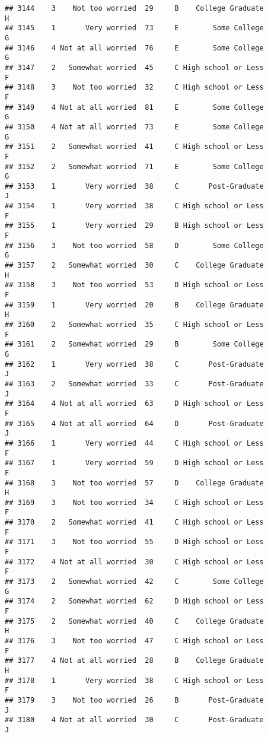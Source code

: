 \documentclass[
]{article}
\begin{document}
\begin{verbatim}
## 3144    3    Not too worried  29     B    College Graduate         H
## 3145    1       Very worried  73     E        Some College         G
## 3146    4 Not at all worried  76     E        Some College         G
## 3147    2   Somewhat worried  45     C High school or Less         F
## 3148    3    Not too worried  32     C High school or Less         F
## 3149    4 Not at all worried  81     E        Some College         G
## 3150    4 Not at all worried  73     E        Some College         G
## 3151    2   Somewhat worried  41     C High school or Less         F
## 3152    2   Somewhat worried  71     E        Some College         G
## 3153    1       Very worried  38     C       Post-Graduate         J
## 3154    1       Very worried  38     C High school or Less         F
## 3155    1       Very worried  29     B High school or Less         F
## 3156    3    Not too worried  58     D        Some College         G
## 3157    2   Somewhat worried  30     C    College Graduate         H
## 3158    3    Not too worried  53     D High school or Less         F
## 3159    1       Very worried  20     B    College Graduate         H
## 3160    2   Somewhat worried  35     C High school or Less         F
## 3161    2   Somewhat worried  29     B        Some College         G
## 3162    1       Very worried  38     C       Post-Graduate         J
## 3163    2   Somewhat worried  33     C       Post-Graduate         J
## 3164    4 Not at all worried  63     D High school or Less         F
## 3165    4 Not at all worried  64     D       Post-Graduate         J
## 3166    1       Very worried  44     C High school or Less         F
## 3167    1       Very worried  59     D High school or Less         F
## 3168    3    Not too worried  57     D    College Graduate         H
## 3169    3    Not too worried  34     C High school or Less         F
## 3170    2   Somewhat worried  41     C High school or Less         F
## 3171    3    Not too worried  55     D High school or Less         F
## 3172    4 Not at all worried  30     C High school or Less         F
## 3173    2   Somewhat worried  42     C        Some College         G
## 3174    2   Somewhat worried  62     D High school or Less         F
## 3175    2   Somewhat worried  40     C    College Graduate         H
## 3176    3    Not too worried  47     C High school or Less         F
## 3177    4 Not at all worried  28     B    College Graduate         H
## 3178    1       Very worried  38     C High school or Less         F
## 3179    3    Not too worried  26     B       Post-Graduate         J
## 3180    4 Not at all worried  30     C       Post-Graduate         J

\end{verbatim}
\end{document}
